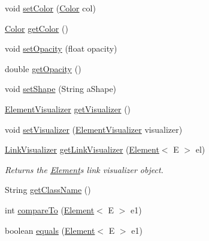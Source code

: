 \begin{DoxyCompactItemize}
\item 
void \mbox{\hyperlink{classbridges_1_1base_1_1_element_aeb3336746d41a180e50b5efaff2dedc2}{set\+Color}} (\mbox{\hyperlink{classbridges_1_1base_1_1_color}{Color}} col)
\item 
\mbox{\hyperlink{classbridges_1_1base_1_1_color}{Color}} \mbox{\hyperlink{classbridges_1_1base_1_1_element_a6b80259f4f23b30df5486bf70f17c3b8}{get\+Color}} ()
\item 
void \mbox{\hyperlink{classbridges_1_1base_1_1_element_a71c622f2cbb03b086c5a8f80d390b366}{set\+Opacity}} (float opacity)
\item 
double \mbox{\hyperlink{classbridges_1_1base_1_1_element_a1427af7efc2d5bc93e00a6a95d268c4d}{get\+Opacity}} ()
\item 
void \mbox{\hyperlink{classbridges_1_1base_1_1_element_ae65bfb47628e028c21c43553ef59b7a2}{set\+Shape}} (String a\+Shape)
\item 
\mbox{\hyperlink{classbridges_1_1base_1_1_element_visualizer}{Element\+Visualizer}} \mbox{\hyperlink{classbridges_1_1base_1_1_element_a42c84d41dfb7bd05a586e303cb33de72}{get\+Visualizer}} ()
\item 
void \mbox{\hyperlink{classbridges_1_1base_1_1_element_a5befa95788099f1bc72cdf5361c55bed}{set\+Visualizer}} (\mbox{\hyperlink{classbridges_1_1base_1_1_element_visualizer}{Element\+Visualizer}} visualizer)
\item 
\mbox{\hyperlink{classbridges_1_1base_1_1_link_visualizer}{Link\+Visualizer}} \mbox{\hyperlink{classbridges_1_1base_1_1_element_a7978552c7b36e28c302f611fc1958e7f}{get\+Link\+Visualizer}} (\mbox{\hyperlink{classbridges_1_1base_1_1_element}{Element}}$<$ E $>$ el)
\begin{DoxyCompactList}\small\item\em Returns the \mbox{\hyperlink{classbridges_1_1base_1_1_element}{Element}}\textquotesingle{}s link visualizer object. \end{DoxyCompactList}\item 
String \mbox{\hyperlink{classbridges_1_1base_1_1_element_aa235244426486921bef319a28616bf8b}{get\+Class\+Name}} ()
\item 
int \mbox{\hyperlink{classbridges_1_1base_1_1_element_a6cd4c4f15c6a4f87f59e443cffe87a20}{compare\+To}} (\mbox{\hyperlink{classbridges_1_1base_1_1_element}{Element}}$<$ E $>$ e1)
\item 
boolean \mbox{\hyperlink{classbridges_1_1base_1_1_element_aff10d60700eb1aceca5c0b519bdccccb}{equals}} (\mbox{\hyperlink{classbridges_1_1base_1_1_element}{Element}}$<$ E $>$ e1)

\end{DoxyCompactItemize}
